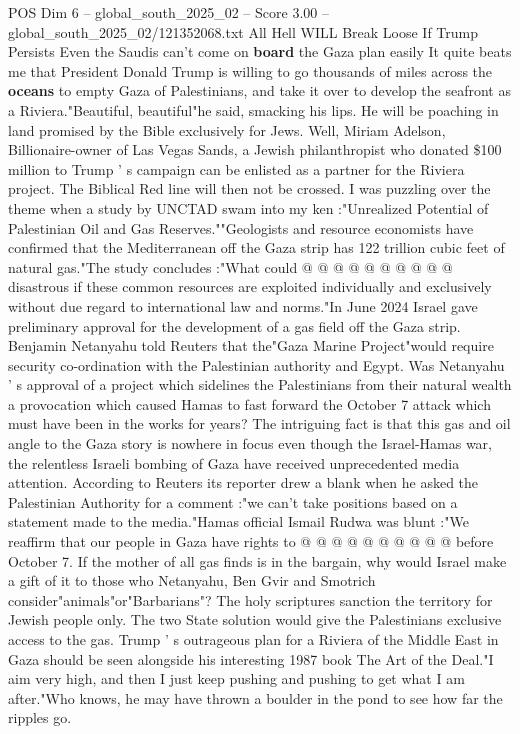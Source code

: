 \begin{textsample}{POS Dim 6 – global\_south\_2025\_02 – Score 3.00 – global\_south\_2025\_02/121352068.txt}  \label{ex:f6_pos_409}
All Hell WILL Break Loose If Trump Persists Even the Saudis can't come on \textbf{board} the Gaza plan easily It quite beats me that President Donald Trump is willing to go thousands of miles across the \textbf{oceans} to empty Gaza of Palestinians, and take it over to develop the seafront as a Riviera."Beautiful, beautiful"he said, smacking his lips.
He will be poaching in land promised by the Bible exclusively for Jews.
Well, Miriam Adelson, Billionaire-owner of Las Vegas Sands, a Jewish philanthropist who donated \$100 million to Trump ' s campaign can be enlisted as a partner for the Riviera project.
The Biblical Red line will then not be crossed.
I was puzzling over the theme when a study by UNCTAD swam into my ken :"Unrealized Potential of Palestinian Oil and Gas Reserves.""Geologists and resource economists have confirmed that the Mediterranean off the Gaza strip has 122 trillion cubic feet of natural gas."The study concludes :"What could @ @ @ @ @ @ @ @ @ @ disastrous if these common resources are exploited individually and exclusively without due regard to international law and norms."In June 2024 Israel gave preliminary approval for the development of a gas field off the Gaza strip.
Benjamin Netanyahu told Reuters that the"Gaza Marine Project"would require security co-ordination with the Palestinian authority and Egypt.
Was Netanyahu ' s approval of a project which sidelines the Palestinians from their natural wealth a provocation which caused Hamas to fast forward the October 7 attack which must have been in the works for years?
The intriguing fact is that this gas and oil angle to the Gaza story is nowhere in focus even though the Israel-Hamas war, the relentless Israeli bombing of Gaza have received unprecedented media attention.
According to Reuters its reporter drew a blank when he asked the Palestinian Authority for a comment :"we can't take positions based on a statement made to the media."Hamas official Ismail Rudwa was blunt :"We reaffirm that our people in Gaza have rights to @ @ @ @ @ @ @ @ @ @ before October 7.
If the mother of all gas finds is in the bargain, why would Israel make a gift of it to those who Netanyahu, Ben Gvir and Smotrich consider"animals"or"Barbarians"?
The holy scriptures sanction the territory for Jewish people only.
The two State solution would give the Palestinians exclusive access to the gas.
Trump ' s outrageous plan for a Riviera of the Middle East in Gaza should be seen alongside his interesting 1987 book The Art of the Deal."I aim very high, and then I just keep pushing and pushing to get what I am after."Who knows, he may have thrown a boulder in the pond to see how far the ripples go.

\end{textsample}
